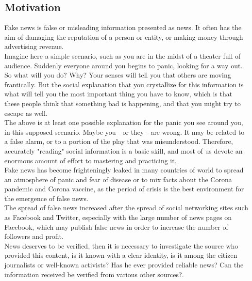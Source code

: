 \documentclass[12pt, letterpaper, twoside]{article}
\begin{document}
\subsection{Motivation}
Fake news is false or misleading information presented as news. It often has the aim of damaging the reputation of a person or entity, or making money through advertising revenue.\\
Imagine here a simple scenario, such as you are in the midst of a theater full of audience. Suddenly everyone around you begins to panic, looking for a way out. So what will you do? Why? Your senses will tell you that others are moving frantically. But the social explanation that you crystallize for this information is what will tell you the most important thing you have to know, which is that these people think that something bad is happening, and that you might try to escape as well.\\
The above is at least one possible explanation for the panic you see around you, in this supposed scenario. Maybe you - or they - are wrong. It may be related to a false alarm, or to a portion of the play that was misunderstood. Therefore, accurately "reading" social information is a basic skill, and most of us devote an enormous amount of effort to mastering and practicing it.\\
Fake news has become frighteningly leaked in many countries of  world to spread an atmosphere of panic and fear of disease or to mix facts about the Corona pandemic and Corona vaccine, as the period of crisis is the best environment for the emergence of false news.\\
The spread of false news increased after the spread of social networking sites such as Facebook and Twitter, especially with the large number of news pages on Facebook, which may publish false news in order to increase the number of followers and profit.\\
 News deserves to be verified, then it is necessary to investigate the source who provided this content, is it known with a clear identity, is it among the citizen journalists or well-known activists? Has he ever provided reliable news? Can the information received be verified from various other sources?.\\
\end{document}
